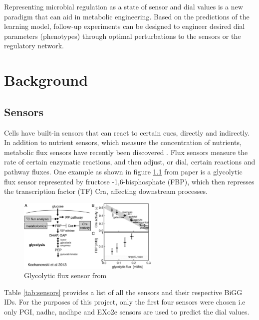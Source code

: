 \documentclass[12pt,chapterheads]{ucsd}
\begin{document}
Representing microbial regulation as a state of sensor and dial values is a new paradigm that can aid in metabolic engineering. Based on the predictions of the learning model, follow-up experiments can be designed to engineer desired dial parameters (phenotypes) through optimal perturbations to the sensors or the regulatory network.


\chapter{Background}

\section{Sensors}
Cells have built-in sensors that can react to certain cues, directly and indirectly. In addition to nutrient sensors, which measure the concentration of nutrients, metabolic flux sensors have recently been discovered \cite{Kochanowski1130}. Flux sensors measure the rate of certain enzymatic reactions, and then adjust, or dial, certain reactions and pathway fluxes. One example as shown in figure \ref{fig:flux} from \cite{Kochanowski1130} paper is a glycolytic flux sensor represented by fructose -1,6-bisphosphate (FBP), which then represses the transcription factor (TF) Cra, affecting downstream processes. 

\begin{figure}[h] 
\centering
\includegraphics[width=0.6\textwidth]{Figures/Flux_sensor}
\caption[Glycolytic flux sensor]
{Glycolytic flux sensor from \cite{Kochanowski1130}}
\label{fig:flux}
\end{figure}

Table \ref{tab:sensors} provides a list of all the sensors and their respective BiGG \cite{doi:10.1093/nar/gkv1049} IDs. For the purposes of this project, only the first four sensors were chosen i.e only PGI, nadh\textunderscore c, nadhp\textunderscore c and 
EX\textunderscore o2\textunderscore e sensors are used to predict the dial values.
\end{document}
